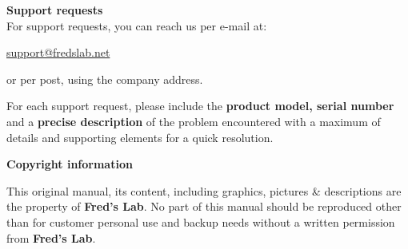 \documentclass{scrartcl}
\begin{document}
\vspace{0.25cm}
\textbf{Support requests} \\
For support requests, you can reach us per e-mail at:
\begin{center}
    \url{support@fredslab.net}
\end{center}
or per post, using the company address.

For each support request, please include the \textbf{product model, serial number} and a \textbf{precise description} of the problem encountered with a maximum of details and supporting elements for a quick resolution.

\vspace{0.5cm}
\textbf{Copyright information}

This original manual, its content, including graphics, pictures \& descriptions are the property of \textbf{Fred's Lab}. No part of this manual should be reproduced other than for customer personal use and backup needs without a written permission from \textbf{Fred's Lab}.

\pagebreak

\end{document}
